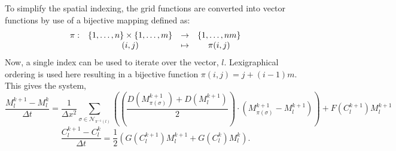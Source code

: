 To simplify the spatial indexing, the grid functions are converted into vector functions by use of a bijective mapping defined as:
\begin{equation}
\begin{array}{c c c c}
  \pi :& \{ 1, \ldots, n\} \times \{1, \ldots, m\} & \to & \{1, \ldots, nm \} \\
       & (i,j)                                     & \mapsto & \pi(i,j)
\end{array}
\end{equation}
Now, a single index can be used to iterate over the vector, $l$. 
Lexigraphical ordering is used here resulting in a bijective function $\pi(i,j) = j+ (i-1)m$.
This gives the system,
\begin{equation} \label{equ:M_space_discret}
  \frac{M^{k+1}_{l} - M^{k}_{l}}{\Delta t} =
    \frac{1}{\Delta x^2} \sum_{\sigma \in \mathcal{N}_{\pi^{-1}(l)}} \left(
    \left( \frac{D(M^{k+1}_{\pi(\sigma)}) + D(M^{k+1}_{l})}{2} \right)
    \cdot \left( M^{k+1}_{\pi(\sigma)} - M^{k+1}_{l} \right) \right)
    + F(C^{k+1}_{l}) M^{k+1}_{l}
\end{equation}
\begin{equation} \label{equ:C_space_discret}
  \frac{C^{k+1}_{l} - C^{k}_{l}}{\Delta t} = \frac{1}{2} ( G(C^{k+1}_{l}) M^{k+1}_{l} + G(C^{k}_{l}) M^{k}_{l} ).
\end{equation}

